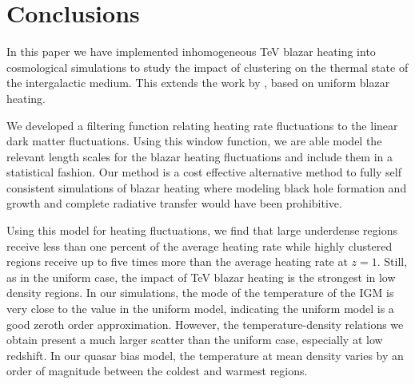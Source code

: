 \documentclass[numberedappendix]{emulateapj}
\begin{document}
\section{Conclusions}
In this paper we have implemented inhomogeneous TeV blazar heating into cosmological simulations to study the impact of clustering on the thermal state of the intergalactic medium. This extends the work by \citet{2012ApJ...752...23C,2012MNRAS.423..149P}, based on uniform blazar heating.

We developed a filtering function relating heating rate fluctuations to the linear dark matter fluctuations. Using this window function, we are able model the relevant length scales for the blazar heating fluctuations and include them in a statistical fashion. Our method is a cost effective alternative method to fully self consistent simulations of blazar heating where modeling black hole formation and growth and complete radiative transfer would have been prohibitive.

Using this model for heating fluctuations, we find that large underdense regions receive less than one percent of the average heating rate while highly clustered regions receive up to five times more than the average heating rate at $z=1$. Still, as in the uniform case, the impact of TeV blazar heating is the strongest in low density regions. In our simulations, the mode of the temperature of the IGM is very close to the value in the uniform model, indicating the uniform model is a good zeroth order approximation. However, the temperature-density relations we obtain present a much larger scatter than the uniform case, especially at low redshift. In our quasar bias model, the temperature at mean density varies by an order of magnitude between the coldest and warmest regions.
\end{document}
